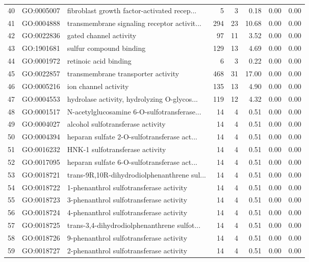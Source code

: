 \begin{table}[ht]
\begin{tabular}{rllrrrrr}
  40 & GO:0005007 & fibroblast growth factor-activated recep... &   5 &   3 & 0.18 & 0.00 & 0.00 \\ 
  41 & GO:0004888 & transmembrane signaling receptor activit... & 294 &  23 & 10.68 & 0.00 & 0.00 \\ 
  42 & GO:0022836 & gated channel activity &  97 &  11 & 3.52 & 0.00 & 0.00 \\ 
  43 & GO:1901681 & sulfur compound binding & 129 &  13 & 4.69 & 0.00 & 0.00 \\ 
  44 & GO:0001972 & retinoic acid binding &   6 &   3 & 0.22 & 0.00 & 0.00 \\ 
  45 & GO:0022857 & transmembrane transporter activity & 468 &  31 & 17.00 & 0.00 & 0.00 \\ 
  46 & GO:0005216 & ion channel activity & 135 &  13 & 4.90 & 0.00 & 0.00 \\ 
  47 & GO:0004553 & hydrolase activity, hydrolyzing O-glycos... & 119 &  12 & 4.32 & 0.00 & 0.00 \\ 
  48 & GO:0001517 & N-acetylglucosamine 6-O-sulfotransferase... &  14 &   4 & 0.51 & 0.00 & 0.00 \\ 
  49 & GO:0004027 & alcohol sulfotransferase activity &  14 &   4 & 0.51 & 0.00 & 0.00 \\ 
  50 & GO:0004394 & heparan sulfate 2-O-sulfotransferase act... &  14 &   4 & 0.51 & 0.00 & 0.00 \\ 
  51 & GO:0016232 & HNK-1 sulfotransferase activity &  14 &   4 & 0.51 & 0.00 & 0.00 \\ 
  52 & GO:0017095 & heparan sulfate 6-O-sulfotransferase act... &  14 &   4 & 0.51 & 0.00 & 0.00 \\ 
  53 & GO:0018721 & trans-9R,10R-dihydrodiolphenanthrene sul... &  14 &   4 & 0.51 & 0.00 & 0.00 \\ 
  54 & GO:0018722 & 1-phenanthrol sulfotransferase activity &  14 &   4 & 0.51 & 0.00 & 0.00 \\ 
  55 & GO:0018723 & 3-phenanthrol sulfotransferase activity &  14 &   4 & 0.51 & 0.00 & 0.00 \\ 
  56 & GO:0018724 & 4-phenanthrol sulfotransferase activity &  14 &   4 & 0.51 & 0.00 & 0.00 \\ 
  57 & GO:0018725 & trans-3,4-dihydrodiolphenanthrene sulfot... &  14 &   4 & 0.51 & 0.00 & 0.00 \\ 
  58 & GO:0018726 & 9-phenanthrol sulfotransferase activity &  14 &   4 & 0.51 & 0.00 & 0.00 \\ 
  59 & GO:0018727 & 2-phenanthrol sulfotransferase activity &  14 &   4 & 0.51 & 0.00 & 0.00 \\ 

\end{tabular}
\end{table}

